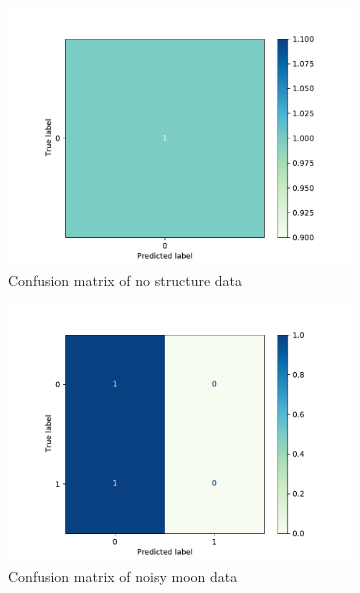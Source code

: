 \begin{figure}[h]
	
	\begin{subfigure}{0.33\textwidth}
		\centering
		\includegraphics[width=\linewidth]{figures/1-cm-NoStructure}
		\caption{Confusion matrix of no structure data}
		\label{fig:p1-4}
	\end{subfigure}
	\begin{subfigure}{0.33\textwidth}
		\centering
		\includegraphics[width=\linewidth]{figures/2-cm-NoisyMoon}  
		\caption{Confusion matrix of noisy moon data}
		\label{fig:p1-5}
	\end{subfigure}
	\begin{subfigure}{0.33\textwidth}
		\centering

\end{subfigure}
\end{figure}
